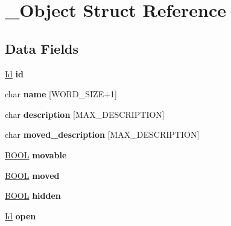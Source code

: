 \hypertarget{struct__Object}{}\section{\+\_\+\+Object Struct Reference}
\label{struct__Object}
\subsection*{Data Fields}
\begin{DoxyCompactItemize}
\item 
\mbox{\label{struct__Object_a3cff7a0e8dc4e9d23895ed9af1b7653a}} 
\hyperlink{types_8h_a845e604fb28f7e3d97549da3448149d3}{Id} {\bfseries id}
\item 
\mbox{\label{struct__Object_a03fb9b8d91f071e8e30d669be79cc040}} 
char {\bfseries name} \mbox{[}W\+O\+R\+D\+\_\+\+S\+I\+ZE+1\mbox{]}
\item 
\mbox{\label{struct__Object_a1e36531c4e160b4c3904be0fc9cb6bc4}} 
char {\bfseries description} \mbox{[}M\+A\+X\+\_\+\+D\+E\+S\+C\+R\+I\+P\+T\+I\+ON\mbox{]}
\item 
\mbox{\label{struct__Object_a825e83566f0b90c845d7fc6279e5f307}} 
char {\bfseries moved\+\_\+description} \mbox{[}M\+A\+X\+\_\+\+D\+E\+S\+C\+R\+I\+P\+T\+I\+ON\mbox{]}
\item 
\mbox{\label{struct__Object_ae013850f78da07c39e530f36bf98f2b9}} 
\hyperlink{types_8h_a3e5b8192e7d9ffaf3542f1210aec18dd}{B\+O\+OL} {\bfseries movable}
\item 
\mbox{\label{struct__Object_a584096c8e43f53884aa7216505cc0e89}} 
\hyperlink{types_8h_a3e5b8192e7d9ffaf3542f1210aec18dd}{B\+O\+OL} {\bfseries moved}
\item 
\mbox{\label{struct__Object_a44824966fc9f4d5f82c189b2e063ddc4}} 
\hyperlink{types_8h_a3e5b8192e7d9ffaf3542f1210aec18dd}{B\+O\+OL} {\bfseries hidden}
\item 
\mbox{\label{struct__Object_a0922dd9891e6aa617ce1d51ae27c0175}} 
\hyperlink{types_8h_a845e604fb28f7e3d97549da3448149d3}{Id} {\bfseries open}
\item 

\end{DoxyCompactItemize}
